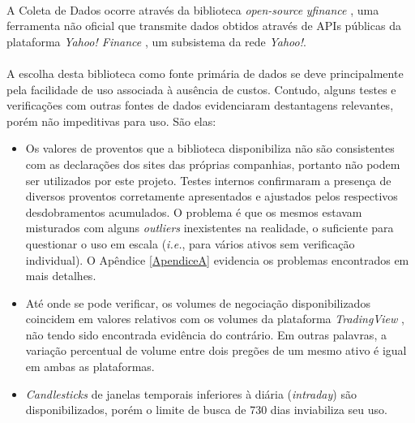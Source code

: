 \paragraph{} A Coleta de Dados ocorre através da biblioteca \textit{open-source} \textit{yfinance} \cite{yfinance}, uma ferramenta não oficial que transmite dados obtidos através de APIs públicas da plataforma \textit{Yahoo! Finance} \cite{yahoo_finance}, um subsistema da rede \textit{Yahoo!}.

\paragraph{} A escolha desta biblioteca como fonte primária de dados se deve principalmente pela facilidade de uso associada à ausência de custos. Contudo, alguns testes e verificações com outras fontes de dados evidenciaram destantagens relevantes, porém não impeditivas para uso. São elas:

\begin{itemize}
    \item Os valores de proventos que a biblioteca disponibiliza não são consistentes com as declarações dos sites das próprias companhias, portanto não podem ser utilizados por este projeto. Testes internos confirmaram a presença de diversos proventos corretamente apresentados e ajustados pelos respectivos desdobramentos acumulados. O problema é que os mesmos estavam misturados com alguns \textit{outliers} inexistentes na realidade, o suficiente para questionar o uso em escala (\textit{i.e.}, para vários ativos sem verificação individual). O Apêndice \ref{ApendiceA} evidencia os problemas encontrados em mais detalhes.

    \item Até onde se pode verificar, os volumes de negociação disponibilizados coincidem em valores relativos com os volumes da plataforma \textit{TradingView} \cite{tradingview}, não tendo sido encontrada evidência do contrário. Em outras palavras, a variação percentual de volume entre dois pregões de um mesmo ativo é igual em ambas as plataformas.

    \item \textit{Candlesticks} de janelas temporais inferiores à diária (\textit{intraday}) são disponibilizados, porém o limite de busca de 730 dias inviabiliza seu uso.
\end{itemize}


